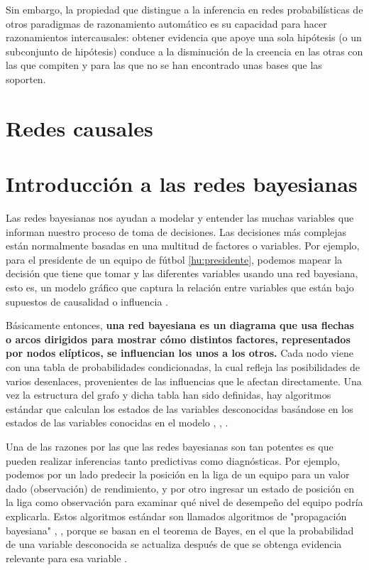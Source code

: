 Sin embargo, la propiedad que distingue a la inferencia en redes probabilísticas
de otros paradigmas de razonamiento automático es su capacidad para hacer razonamientos intercausales: 
obtener evidencia que apoye una sola hipótesis (o un subconjunto de
hipótesis) conduce a la disminución de la creencia en las otras con las que compiten y para las que no se 
han encontrado unas bases que las soporten. 

\section{Redes causales}

\section{Introducción a las redes bayesianas}
Las redes bayesianas nos ayudan a modelar y entender las muchas variables que informan nuestro proceso de 
toma de decisiones. Las decisiones más complejas están normalmente basadas en una multitud de factores o 
variables. Por ejemplo, para el presidente de un equipo de fútbol \ref{hu:presidente}, podemos 
mapear la decisión que tiene que tomar y las diferentes variables usando 
una red bayesiana, esto es, un modelo gráfico que captura la relación entre variables que están bajo 
supuestos de causalidad o influencia \cite{things-to-know-BN}.

Básicamente entonces, \textbf{una red bayesiana es un diagrama que 
usa flechas o arcos dirigidos para mostrar cómo distintos factores, representados por nodos elípticos, se 
influencian los unos a los otros.} Cada nodo viene con una tabla de probabilidades condicionadas, la cual refleja las 
posibilidades de varios desenlaces, provenientes de las influencias que le afectan directamente. Una vez 
la estructura del grafo y dicha tabla han sido definidas, hay algoritmos estándar que 
calculan los estados de las variables desconocidas basándose en los estados de las variables conocidas en el
modelo \cite{learning-algorithms-BN-comparison}, \cite{BN-achilles-heel}, \cite{different-algorithmic-schemes}.

Una de las razones por las que las redes bayesianas son tan potentes es que pueden realizar inferencias 
tanto predictivas como diagnósticas. Por ejemplo, podemos por un lado predecir la posición en la liga de un equipo para 
un valor dado (observación) de rendimiento, y por otro ingresar un estado de posición en la 
liga como observación para examinar qué nivel de desempeño del equipo podría explicarla. Estos algoritmos estándar son
llamados algoritmos de "propagación bayesiana" \cite{Cano2004}, \cite{more-algorithms}, \cite{back-prop} porque se basan en el teorema de Bayes, en el que la 
probabilidad de una variable desconocida se actualiza después de que se obtenga evidencia relevante para esa variable \cite{prop-alg}.

